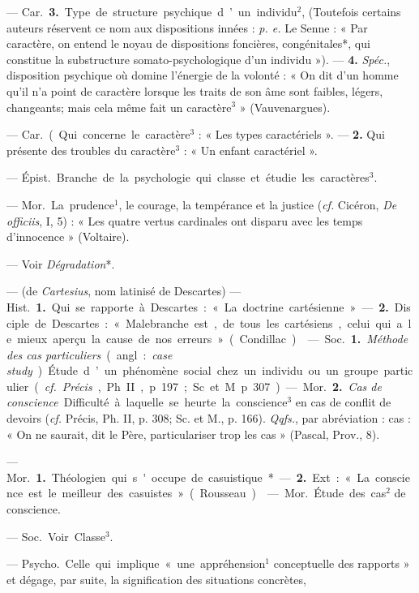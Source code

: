 \begin{itemize}[leftmargin=1cm, label=, itemsep=11pt]
— \si{Car.} {\bf 3.} Type de structure psychique d’un individu$^2$, (Toutefois
certains auteurs réservent ce nom
aux dispositions innées : {\it p. e.} Le
Senne : « Par caractère, on entend
le noyau de dispositions foncières,
congénitales*, qui constitue la substructure somato-psychologique d’un
individu »). — {\bf 4.} {\it Spéc.}, disposition
psychique où domine l'énergie de
la volonté : « On dit d’un homme
qu’il n’a point de caractère lorsque
les traits de son âme sont faibles,
légers, changeants; mais cela même
fait un caractère$^3$ » (Vauvenargues).

 — \si{Car.} (. Qui concerne le
caractère$^3$ : « Les types caractériels ». — {\bf 2.} Qui présente des troubles
du caractère$^3$ : « Un enfant caractériel ».

 — \si{Épist.} Branche de la
psychologie qui classe et étudie les
caractères$^3$.

 — \si{Mor.} La prudence$^1$, le courage, la tempérance
et la justice ({\it cf.} Cicéron, {\it De officiis},
I, 5) : « Les quatre vertus cardinales
ont disparu avec les temps d’innocence » (Voltaire).

 — Voir {\it Dégradation}*.

 — (de {\it Cartesius}, nom latinisé
de Descartes) — \si{Hist.} {\bf 1.} Qui se
rapporte à Descartes : « La doctrine
cartésienne ». — {\bf 2.} Disciple de Descartes : « Malebranche est, de tous
les cartésiens, celui qui a le mieux
aperçu la cause de nos erreurs »
(Condillac).

 — \si{Soc.} {\bf 1.} {\it Méthode des cas particuliers} (angl. : {\it case study}). Étude
d’un phénomène social chez un individu ou un groupe particulier ({\it cf.} 
{\it Précis}, Ph. II, p. 197; Sc. et M.
p. 307). — \si{Mor.} {\bf 2.} {\it Cas de conscience}.
Difficulté à laquelle se heurte la
conscience$^3$ en cas de conflit de
devoirs ({\it cf.} Précis, Ph. II, p. 308;
Sc. et M., p. 166). {\it Qqfs.}, par abréviation : cas : « On ne saurait, dit le
Père, particulariser trop les cas »
(Pascal, Prov., 8).

 — \si{Mor.} {\bf 1.} Théologien qui
s'occupe de casuistique*. — {\bf 2.} Ext. :
« La conscience est le meilleur des
casuistes » (Rousseau).

 — \si{Mor.} Étude des cas$^2$
de conscience.

 — \si{Soc.} Voir Classe$^3$.

 — \si{Psycho.}
Celle qui implique « une appréhension$^1$ conceptuelle des rapports » et
dégage, par suite, la signification
des situations concrètes,


\end{itemize}
